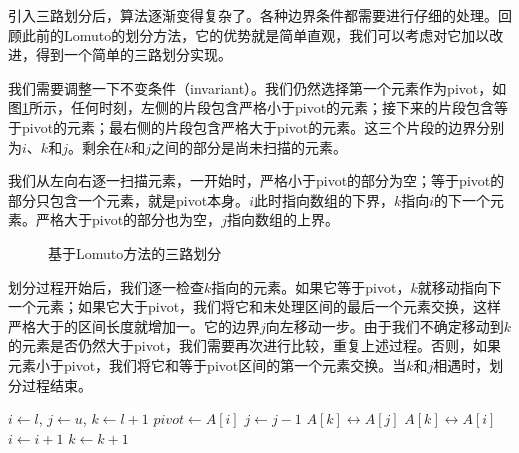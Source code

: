 \documentclass{ctexart}
\begin{document}
引入三路划分后，算法逐渐变得复杂了。各种边界条件都需要进行仔细的处理。回顾此前的Lomuto的划分方法，它的优势就是简单直观，我们可以考虑对它加以改进，得到一个简单的三路划分实现。

我们需要调整一下不变条件（invariant）。我们仍然选择第一个元素作为pivot，如图\ref{fig:partition-3-way-lomuto}所示，任何时刻，左侧的片段包含严格小于pivot的元素；接下来的片段包含等于pivot的元素；最右侧的片段包含严格大于pivot的元素。这三个片段的边界分别为$i$、$k$和$j$。剩余在$k$和$j$之间的部分是尚未扫描的元素。

我们从左向右逐一扫描元素，一开始时，严格小于pivot的部分为空；等于pivot的部分只包含一个元素，就是pivot本身。$i$此时指向数组的下界，$k$指向$i$的下一个元素。严格大于pivot的部分也为空，$j$指向数组的上界。

\begin{figure}[htbp]
   \centering
   \caption{基于Lomuto方法的三路划分}
   \label{fig:partition-3-way-lomuto}
\end{figure}

划分过程开始后，我们逐一检查$k$指向的元素。如果它等于pivot，$k$就移动指向下一个元素；如果它大于pivot，我们将它和未处理区间的最后一个元素交换，这样严格大于的区间长度就增加一。它的边界$j$向左移动一步。由于我们不确定移动到$k$的元素是否仍然大于pivot，我们需要再次进行比较，重复上述过程。否则，如果元素小于pivot，我们将它和等于pivot区间的第一个元素交换。当$k$和$j$相遇时，划分过程结束。

\begin{algorithmic}[1]
    \State $i \gets l$, $j \gets u$, $k \gets l + 1$
    \State $pivot \gets A[i]$
        \State $j \gets j - 1$
        \State {} $A[k] \leftrightarrow A[j]$
      \EndWhile
        \State {} $A[k] \leftrightarrow A[i]$
        \State $i \gets i + 1$
      \EndIf
      \State $k \gets k + 1$
    \EndWhile
    \State {}
    \State {}
  \EndIf
\EndProcedure
\end{algorithmic}
\end{document}
